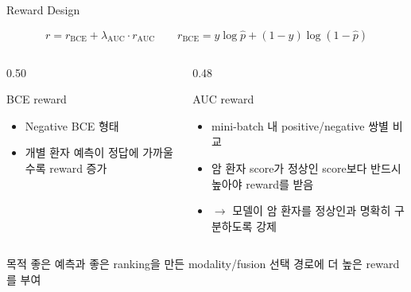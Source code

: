 \documentclass[11pt,notheorems,hyperref={pdfauthor=whatever}]{beamer}
\begin{document}
\begin{frame}[t]{Reward Design}
\small
\begin{center}
{\Large
\[
r = r_{\mathrm{BCE}} + \lambda_{\mathrm{AUC}}\cdot r_{\mathrm{AUC}}
\qquad
r_{\mathrm{BCE}} = y\log\hat p+(1-y)\log(1-\hat p)
\]
}
\end{center}
\vspace{-0.35em}
\begin{columns}[T,onlytextwidth]
\begin{column}{0.50\textwidth}
\begin{block}{BCE reward}
\begin{itemize}
  \item Negative BCE 형태
  \item 개별 환자 예측이 정답에 가까울수록 reward 증가
\end{itemize}
\end{block}
\end{column}
\begin{column}{0.48\textwidth}
\begin{block}{AUC reward}
\begin{itemize}
  \item mini-batch 내 positive/negative 쌍별 비교
  \item 암 환자 score가 정상인 score보다 반드시 높아야 reward를 받음
  \item \(\rightarrow\) 모델이 암 환자를 정상인과 명확히 구분하도록 강제
\end{itemize}
\end{block}
\end{column}
\end{columns}
\vspace{0.45em}
\begin{block}{목적}
\centering\large
좋은 예측과 좋은 ranking을 만든 modality/fusion 선택 경로에 더 높은 reward를 부여
\end{block}
\end{frame}
\end{document}
